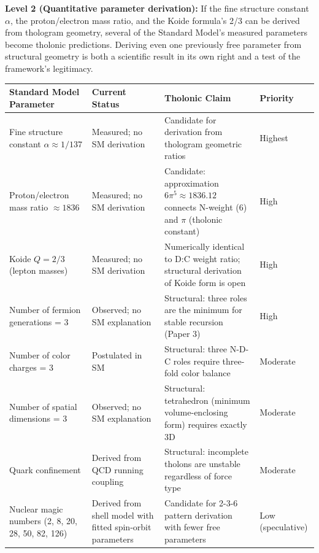 \documentclass[12pt]{article}
\begin{document}
\textbf{Level 2 (Quantitative parameter derivation):} If the fine
structure constant \(\alpha\), the proton/electron mass ratio, and the
Koide formula's 2/3 can be derived from thologram geometry, several of
the Standard Model's measured parameters become tholonic predictions.
Deriving even one previously free parameter from structural geometry is
both a scientific result in its own right and a test of the framework's
legitimacy.

\begin{longtable}[]{@{}
  >{\raggedright\arraybackslash}p{}
  >{\raggedright\arraybackslash}p{}
  >{\raggedright\arraybackslash}p{}
  >{\raggedright\arraybackslash}p{}@{}}
\toprule\noalign{}
\begin{minipage}[b]{\linewidth}\raggedright
Standard Model Parameter
\end{minipage} & \begin{minipage}[b]{\linewidth}\raggedright
Current Status
\end{minipage} & \begin{minipage}[b]{\linewidth}\raggedright
Tholonic Claim
\end{minipage} & \begin{minipage}[b]{\linewidth}\raggedright
Priority
\end{minipage} \\
\midrule\noalign{}
\endhead
\bottomrule\noalign{}
\endlastfoot
Fine structure constant \(\alpha \approx 1/137\) & Measured; no SM
derivation & Candidate for derivation from thologram geometric ratios &
Highest \\
Proton/electron mass ratio \(\approx 1836\) & Measured; no SM derivation
& Candidate: approximation \(6\pi^5 \approx 1836.12\) connects N-weight
(6) and \(\pi\) (tholonic constant) & High \\
Koide \(Q = 2/3\) (lepton masses) & Measured; no SM derivation &
Numerically identical to D:C weight ratio; structural derivation of
Koide form is open & High \\
Number of fermion generations = 3 & Observed; no SM explanation &
Structural: three roles are the minimum for stable recursion (Paper 3) &
High \\
Number of color charges = 3 & Postulated in SM & Structural: three N-D-C
roles require three-fold color balance & Moderate \\
Number of spatial dimensions = 3 & Observed; no SM explanation &
Structural: tetrahedron (minimum volume-enclosing form) requires exactly
3D & Moderate \\
Quark confinement & Derived from QCD running coupling & Structural:
incomplete tholons are unstable regardless of force type & Moderate \\
Nuclear magic numbers (2, 8, 20, 28, 50, 82, 126) & Derived from shell
model with fitted spin-orbit parameters & Candidate for 2-3-6 pattern
derivation with fewer free parameters & Low (speculative) \\
\end{longtable}
\end{document}
